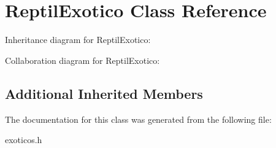 \hypertarget{classReptilExotico}{}\section{Reptil\+Exotico Class Reference}
\label{classReptilExotico}


Inheritance diagram for Reptil\+Exotico\+:


Collaboration diagram for Reptil\+Exotico\+:
\subsection*{Additional Inherited Members}


The documentation for this class was generated from the following file\+:\begin{DoxyCompactItemize}
\item 
exoticos.\+h\end{DoxyCompactItemize}
